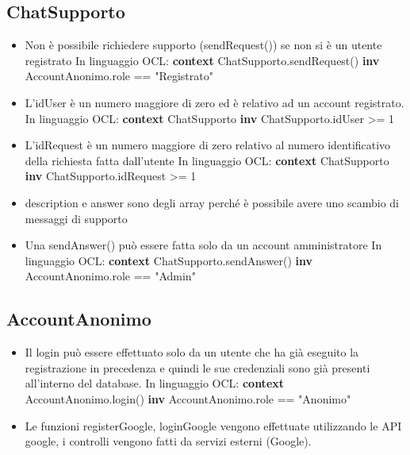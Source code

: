 \documentclass[a4paper,12pt]{article}
\begin{document}
\subsection{ChatSupporto}
\begin{itemize}
    \item Non è possibile richiedere supporto (sendRequest()) se non si è un utente registrato
    \newline \newline In linguaggio OCL:\newline
    \textbf{context} ChatSupporto.sendRequest() 
    \textbf{inv} AccountAnonimo.role == "Registrato"
    \item L'idUser è un numero maggiore di zero ed è relativo ad un account registrato. \newline \newline In linguaggio OCL:\newline
    \textbf{context} ChatSupporto
    \textbf{inv} ChatSupporto.idUser >= 1
    \item L'idRequest è un numero maggiore di zero relativo al numero identificativo della richiesta fatta dall'utente \newline \newline In linguaggio OCL:\newline
    \textbf{context} ChatSupporto
    \textbf{inv} ChatSupporto.idRequest >= 1
    \item description e answer sono degli array perché è possibile avere uno scambio di messaggi di supporto     
    \item  Una sendAnswer() può essere fatta solo da un account amministratore \newline \newline In linguaggio OCL:\newline
    \textbf{context} ChatSupporto.sendAnswer() 
    \textbf{inv} AccountAnonimo.role == "Admin"
\end{itemize}

\subsection{AccountAnonimo}
\begin{itemize}
    \item Il login può essere effettuato solo da un utente che ha già eseguito la registrazione in precedenza e quindi le sue credenziali sono già presenti all'interno del database. \newline \newline In linguaggio OCL:\newline
    \textbf{context} AccountAnonimo.login() 
    \textbf{inv} AccountAnonimo.role == "Anonimo"
    
    \item Le funzioni registerGoogle, loginGoogle vengono effettuate utilizzando le API google, i controlli vengono fatti da servizi esterni (Google).
\end{itemize}
\end{document}
